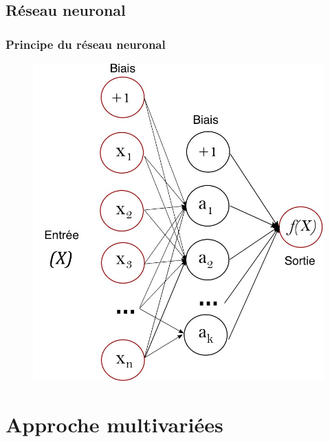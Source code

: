 \documentclass{beamer}
\begin{document}
\subsection{Réseau neuronal}
\begin{frame}
	\frametitle{Principe du réseau neuronal}
	\begin{figure}[t]
		\centering
		\begin{minipage}{0.5\textwidth}
			\includegraphics[scale=0.2]{nn_sk}
		\end{minipage}
	\end{figure}
\end{frame}


\section{Approche multivariées}
\end{document}
